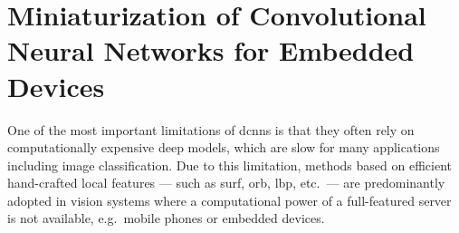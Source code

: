 

\graphicspath{{img/parking/}}

\chapter{Miniaturization of Convolutional Neural Networks for Embedded Devices}
\label{ch:miniaturization}

One of the most important limitations of \glspl{dcnn} is that they often rely on computationally expensive deep models, which are slow for many applications including image classification.
Due to this limitation, methods based on efficient hand-crafted local features --- such as \acrshort{surf}, \acrshort{orb}, \acrshort{lbp}, etc.\ --- are predominantly adopted in vision systems where a computational power of a full-featured server is not available, e.g.\ mobile phones or embedded devices.

